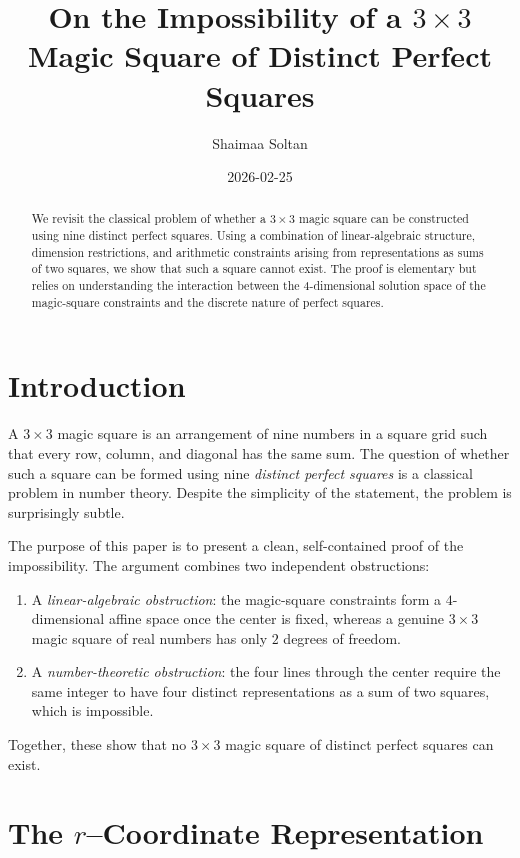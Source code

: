\documentclass[12pt]{article}
\title{On the Impossibility of a $3\times 3$ Magic Square of Distinct Perfect Squares}
\author{Shaimaa Soltan}
\date{2026-02-25}
\begin{document}
\maketitle

\begin{abstract}
We revisit the classical problem of whether a $3\times 3$ magic square can be
constructed using nine distinct perfect squares.  Using a combination of
linear-algebraic structure, dimension restrictions, and arithmetic constraints
arising from representations as sums of two squares, we show that such a
square cannot exist.  The proof is elementary but relies on understanding the
interaction between the $4$-dimensional solution space of the magic-square
constraints and the discrete nature of perfect squares.
\end{abstract}

\section{Introduction}

A $3\times 3$ magic square is an arrangement of nine numbers in a square grid
such that every row, column, and diagonal has the same sum.  The question of
whether such a square can be formed using nine \emph{distinct perfect squares}
is a classical problem in number theory.  Despite the simplicity of the
statement, the problem is surprisingly subtle.

The purpose of this paper is to present a clean, self-contained proof of the
impossibility.  The argument combines two independent obstructions:

\begin{enumerate}
    \item A \emph{linear-algebraic obstruction}: the magic-square constraints
    form a $4$-dimensional affine space once the center is fixed, whereas a
    genuine $3\times 3$ magic square of real numbers has only $2$ degrees of
    freedom.

    \item A \emph{number-theoretic obstruction}: the four lines through the
    center require the same integer to have four distinct representations as a
    sum of two squares, which is impossible.
\end{enumerate}

Together, these show that no $3\times 3$ magic square of distinct perfect
squares can exist.

\section{The $r$--Coordinate Representation}
\end{document}
